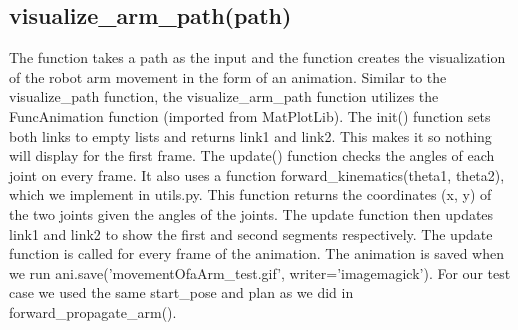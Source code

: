 \documentclass[12pt]{article}
\begin{document}
\subsection*{visualize\_arm\_path(path)}
The function takes a path as the input and the function creates the visualization of the robot arm movement in the form of an animation. Similar to the visualize\_path function, the visualize\_arm\_path function utilizes the FuncAnimation function (imported from MatPlotLib). The init() function sets both links to empty lists and returns link1 and link2. This makes it so nothing will display for the first frame. The update() function checks the angles of each joint on every frame. It also uses a function forward\_kinematics(theta1, theta2), which we implement in utils.py. This function returns the coordinates (x, y) of the two joints given the angles of the joints. The update function then updates link1 and link2 to show the first and second segments respectively. The update function is called for every frame of the animation. The animation is saved when we run ani.save('movementOfaArm\_test.gif', writer='imagemagick'). For our test case we used the same start\_pose and plan as we did in forward\_propagate\_arm().
\end{document}
